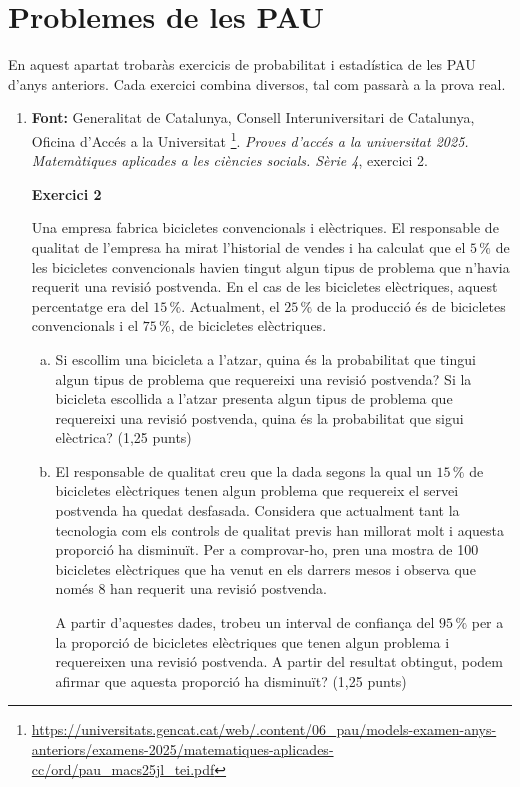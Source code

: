 \section{Problemes de les PAU}
En aquest apartat trobaràs exercicis de probabilitat i estadística de les PAU d'anys anteriors. Cada exercici combina diversos, tal com passarà a la prova real.
\begin{enumerate}
 \item \textbf{Font:} Generalitat de Catalunya, Consell Interuniversitari de Catalunya, Oficina d'Accés a la Universitat \footnote{\url{https://universitats.gencat.cat/web/.content/06_pau/models-examen-anys-anteriors/examens-2025/matematiques-aplicades-cc/ord/pau_macs25jl_tei.pdf}}. \textit{Proves d'accés a la universitat 2025. Matemàtiques aplicades a les ciències socials. Sèrie 4}, exercici 2.

 \textbf{Exercici 2}

 Una empresa fabrica bicicletes convencionals i elèctriques. El responsable de qualitat de l'empresa ha mirat l'historial de vendes i ha calculat que el $5\,\%$ de les bicicletes convencionals havien tingut algun tipus de problema que n'havia requerit una revisió postvenda. En el cas de les bicicletes elèctriques, aquest percentatge era del $15\,\%$. Actualment, el $25\,\%$ de la producció és de bicicletes convencionals i el $75\,\%$, de bicicletes elèctriques.
 \begin{enumerate}[a)]
 \item Si escollim una bicicleta a l'atzar, quina és la probabilitat que tingui algun tipus de problema que requereixi una revisió postvenda? Si la bicicleta escollida a l'atzar presenta algun tipus de problema que requereixi una revisió postvenda, quina és la probabilitat que sigui elèctrica? (1,25 punts)
 \item El responsable de qualitat creu que la dada segons la qual un $15\,\%$ de bicicletes elèctriques tenen algun problema que requereix el servei postvenda ha quedat desfasada. Considera que actualment tant la tecnologia com els controls de qualitat previs han millorat molt i aquesta proporció ha disminuït. Per a comprovar-ho, pren una mostra de 100 bicicletes elèctriques que ha venut en els darrers mesos i observa que només 8 han requerit una revisió postvenda.

 A partir d'aquestes dades, trobeu un interval de confiança del $95\,\%$ per a la proporció de bicicletes elèctriques que tenen algun problema i requereixen una revisió postvenda. A partir del resultat obtingut, podem afirmar que aquesta proporció ha disminuït? (1,25 punts)


\end{enumerate}
\end{enumerate}
